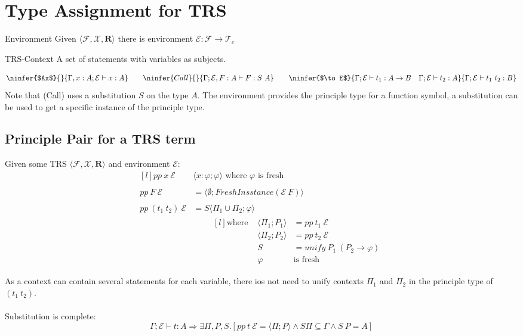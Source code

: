 \section{Type Assignment for TRS}
\begin{tcbraster}[raster columns=2,raster equal height]
    \begin{definitionbox}{Environment}
        Given $\langle \mathcal{F}, \mathcal{X}, \mathbf{R} \rangle$ there is environment $\mathcal{E} : \mathcal{F} \to \mathcal{T}_c$
    \end{definitionbox}
    \begin{definitionbox}{TRS-Context}
        A set of statements with variables as subjects.
    \end{definitionbox}
\end{tcbraster}
\[\ninfer{$Ax$}{}{\Gamma, x:A ; \mathcal{E} \vdash x : A} \qquad \ninfer{Call}{}{\Gamma; \mathcal{E}, F:A \vdash F : S \ A} \qquad \ninfer{$\to E$}{\Gamma;\mathcal{E} \vdash t_1 : A \to B \quad \Gamma;\mathcal{E} \vdash t_2 : A}{\Gamma ; \mathcal{E} \vdash t_1 \ t_2 : B}\]
Note that (Call) uses a substitution $S$ on the type $A$. The environment provides the principle type for a function symbol, a substitution can be used to get a specific instance of the principle type.

\subsection{Principle Pair for a TRS term}
Given some TRS $\langle \mathcal{F}, \mathcal{X}, \mathbf{R} \rangle$ and environment $\mathcal{E}$:
\[\begin{matrix*}[l]
    pp \ x \ \mathcal{E} & \langle x:\varphi; \varphi \rangle \text{ where } \varphi \text{ is fresh} \\
    \\
    pp \ F \ \mathcal{E} & = \langle \emptyset; FreshInsstance (\mathcal{E} \ F) \rangle \\
    \\
    pp \ (t_1 \ t_2) \ \mathcal{E} & = S \langle \Pi_1 \cup \Pi_2 ; \varphi \rangle \\
    & \qquad \begin{matrix*}[l]
        \text{where } & \langle \Pi_1 ; P_1 \rangle & = pp \ t_1 \ \mathcal{E} \\
        & \langle \Pi_2 ; P_2 \rangle & = pp \ t_2 \ \mathcal{E} \\
        & S & = unify \ P_1 \ (P_2 \to \varphi) \\
        & \varphi & \text{is fresh} \\
    \end{matrix*} \\
\end{matrix*}\]
As a context can contain several statements for each variable, there ios not need to unify contexts $\Pi_1$ and $\Pi_2$ in the principle type of $(t_1 \ t_2)$.
\\
\\ Substitution is complete:
\[\Gamma ; \mathcal{E} \vdash t : A \Rightarrow \exists \Pi, P, S . [pp \ t \ \mathcal{E} = \langle \Pi ; P \rangle \land S \Pi \subseteq \Gamma \land S \ P = A]\]

